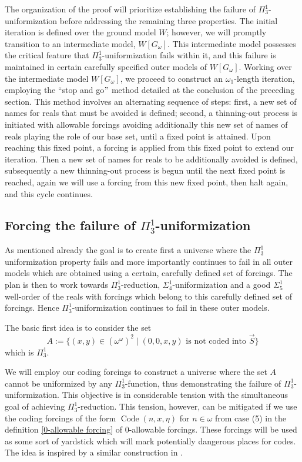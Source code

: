 \documentclass[a4paper,11pt]{article}
\begin{document}
The organization of the proof will prioritize establishing the failure of $\Pi^1_3$-uniformization before addressing the remaining three properties. The initial iteration is defined over the ground model $W$; however, we will promptly transition to an intermediate model, $W[G_{\omega}]$. This intermediate model possesses the critical feature that $\Pi^1_3$-uniformization fails within it, and this failure is maintained in certain carefully specified outer models of $W[G_{\omega}]$. Working over the intermediate model $W[G_{\omega}]$, we proceed to construct an $\omega_1$-length iteration, employing the ``stop and go$"$ method detailed at the conclusion of the preceding section. This method involves an alternating sequence of steps: first, a new set of names for reals that must be avoided is defined; second, a thinning-out process is initiated with allowable forcings avoiding additionally this new set of names of reals playing the role of our base set, until a fixed point is attained. Upon reaching this fixed point, a forcing is applied from this fixed point to extend our iteration. Then a new set of names for reals to be additionally avoided is defined, subsequently a new thinning-out process is begun until the next fixed point is reached, again we will use a forcing from this new fixed point, then halt again, and this cycle continues.

 
   
  \subsection{Forcing the failure of \texorpdfstring{$\Pi^1_3$}{Pi13}-uniformization}
As mentioned already the goal is to create first a universe where the $\Pi^1_3$ uniformization property fails and more importantly continues to fail in all outer models which are obtained using a certain, carefully defined set of forcings. The plan is then to work towards $\Pi^1_3$-reduction, $\Sigma^1_4$-uniformization and a good $\Sigma^1_5$ well-order of the reals with forcings which belong to this carefully defined set of forcings. Hence $\Pi^1_3$-uniformization continues to fail in these outer models. 

The basic first idea is to consider the set 
    ﻿
    \[ A:= \{ (x,y) \in (\omega^{\omega})^2 \mid (0,0,x,y) \text{ is not coded into $\vec{S}$} \}\]
    ﻿
    which is $\Pi^1_3$.

    We will employ our coding forcings to construct a universe where the set $A$ cannot be uniformized by any $\Pi^1_3$-function, thus demonstrating the failure of $\Pi^1_3$-uniformization. This objective is in considerable tension with the simultaneous goal of achieving $\Pi^1_3$-reduction. This tension, however, can be mitigated if  we use the coding forcings of the form $\operatorname{Code} (n,x,\eta)$ for $n \in \omega$ from case (5) in the definition \ref{0-allowable forcing} of 0-allowable forcings. These forcings will be used as some sort of yardstick which will mark potentially dangerous places for codes. The idea is inspired by a similar construction in \cite{Separation}.
\end{document}
